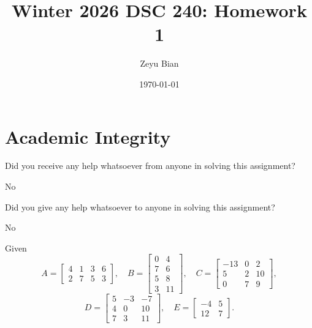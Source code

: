 \documentclass[en,hazy,blue,12pt,normal]{elegantnote}
\title{Winter 2026 DSC 240: Homework 1}
\author{Zeyu Bian}
\date{\today}
\begin{document}
\maketitle


\section*{Academic Integrity}
Did you receive any help whatsoever from anyone in solving this assignment? 

No

Did you give any help whatsoever to anyone in solving this assignment? 

No

\begin{homework}
    Given
\[
A=
\begin{bmatrix}
4 & 1 & 3 & 6\\
2 & 7 & 5 & 3
\end{bmatrix},\quad
B=
\begin{bmatrix}
0 & 4\\
7 & 6\\
5 & 8\\
3 & 11
\end{bmatrix},\quad
C=
\begin{bmatrix}
-13 & 0 & 2\\
5 & 2 & 10\\
0 & 7 & 9
\end{bmatrix},
\]
\[
D=
\begin{bmatrix}
5 & -3 & -7\\
4 & 0 & 10\\
7 & 3 & 11
\end{bmatrix},\quad
E=
\begin{bmatrix}
-4 & 5\\
12 & 7
\end{bmatrix}.
\]
\end{homework}
\end{document}
